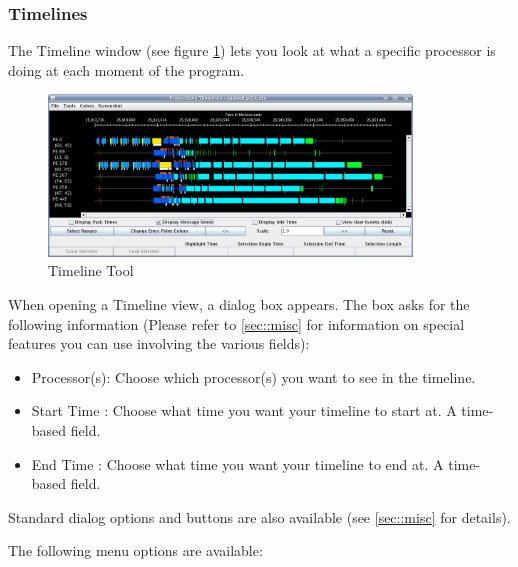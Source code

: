 \documentclass[10pt]{article}
\begin{document}
\subsubsection{Timelines}
\label{sec::timeline view}


The Timeline window (see figure \ref{timeline}) lets you look at what
a specific processor is doing at each moment of the program.

\begin{figure}[htb]
\center
\includegraphics[width=3.8in]{fig/timeline}
\caption{Timeline Tool}
\label{timeline}
\end{figure}


When opening a Timeline view, a dialog box appears. 
The box asks for the following information (Please refer to
\ref{sec::misc} for information on special features you can
use involving the various fields):

\begin{itemize}
\item
Processor(s): Choose which processor(s) you want to see in the timeline.
\item
Start Time  : Choose what time you want your timeline to start at.
A time-based field.
\item
End Time    : Choose what time you want your timeline to end at. A time-based
field.
\end{itemize}

Standard \projections{} dialog options and buttons are also available
(see \ref{sec::misc} for details).


The following menu options are available:
\end{document}
